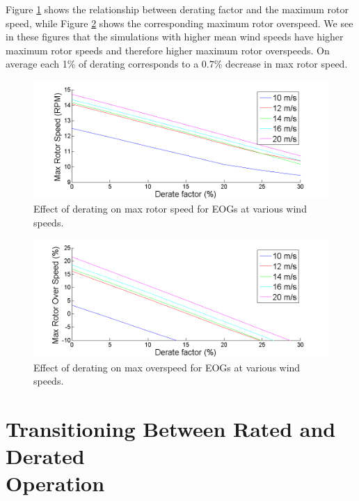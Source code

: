 Figure \ref{fig4-8} shows the relationship between derating factor and the maximum rotor speed, while Figure \ref{fig4-9} shows the corresponding maximum rotor overspeed. We see in these figures that the simulations with higher mean wind speeds have higher maximum rotor speeds and therefore higher maximum rotor overspeeds. On average each 1\% of derating corresponds to a 0.7\% decrease in max rotor speed.

\begin{figure}[htb]
	\centering
		\includegraphics[width = \linewidth]{Figures/ch4Figures/fig4-8.png}
		
	\caption{Effect of derating on max rotor speed for EOGs at various wind speeds.}
	\label{fig4-8}
\end{figure}

\begin{figure}[htb]
	\centering
		\includegraphics[width = \linewidth]{Figures/ch4Figures/fig4-9.png}
		
	\caption{Effect of derating on max overspeed for EOGs at various wind speeds.}
	\label{fig4-9}
\end{figure}



\section{Transitioning Between Rated and Derated \\
		Operation} \label{section4-4}


